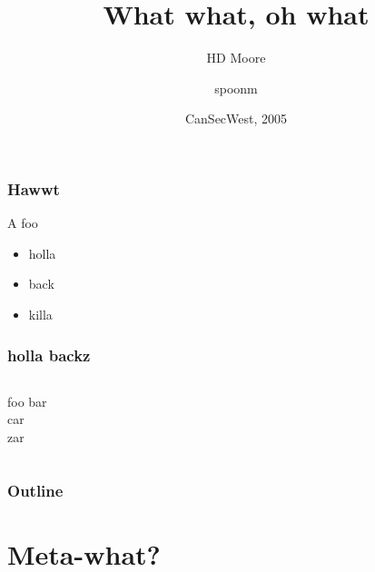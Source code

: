 \documentclass{beamer}
\title{What what, oh what}
\author[HD Moore, spoonm]
{HD Moore \and spoonm}
\date[CSW 2005] %
{CanSecWest, 2005}
\begin{document}
\begin{frame}
  \titlepage
\end{frame}

\begin{frame}
  \frametitle{Hawwt}
  \begin{definition}
    A \alert{foo}
  \end{definition}
  \begin{example}
    \begin{itemize}
    \item holla
    \item back
    \pause
    \item killa
    \end{itemize}
  \end{example}
\end{frame}

\begin{frame}
\frametitle{holla backz}
\begin{columns}[t]
  foo
  \pause
  bar \\
  car \\
  zar
\end{columns}
\end{frame}

\begin{frame}
  \frametitle{Outline}
  \tableofcontents
\end{frame}





\section{Meta-what?}
\end{document}
